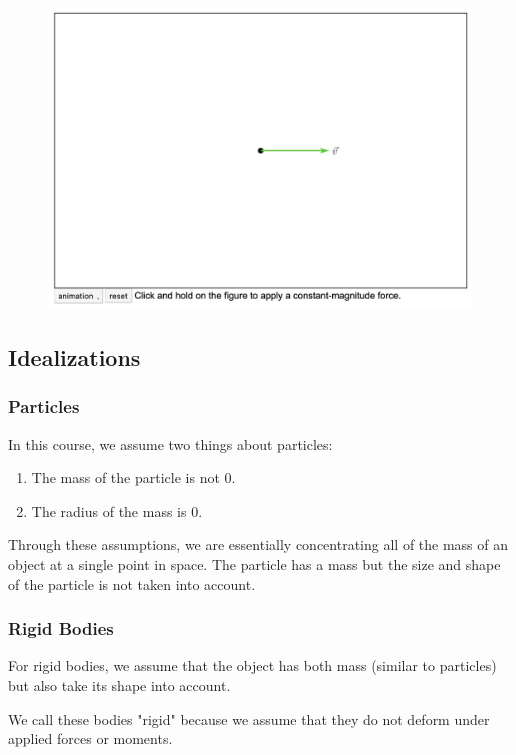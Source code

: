 \begin{figure}[!h]
\centering
\includegraphics[angle=0, width=5in]{IntroductionFigures/NewtonsLaws.png}
\vspace{-2mm}
\caption{\small {}}
\vspace{-3mm}
\label{Fig:NewtonsLaws}
\end{figure}

\subsection{Idealizations}

\subsubsection{Particles}

In this course, we assume two things about particles: 

\begin{enumerate}
    \item{The mass of the particle is not 0.}
    \item{The radius of the mass is 0.}
\end{enumerate}

\noindent Through these assumptions, we are essentially concentrating all of the mass of an object at a single point in space. The particle has a mass but the size and shape of the particle is not taken into account. 

\subsubsection{Rigid Bodies}

For rigid bodies, we assume that the object has both mass (similar to particles) but also take its shape into account. 

We call these bodies "rigid" because we assume that they do not deform under applied forces or moments. 


